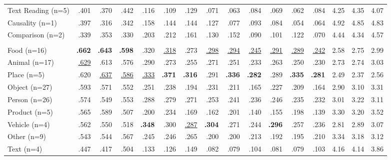 \begin{table}[ht]
{\begin{tabular}{lrrrrrrrrrrrrrrr}
Text Reading (n=5)  & .401 & .370 & .442 & .116 & .109 & .129 & .071 & .063 & .084 & .069 & .062 & .084 & 4.25 & 4.35 & 4.07 \\
Causality (n=1)  & .397 & .316 & .342 & .158 & .144 & .144 & .127 & .077 & .093 & .084 & .054 & .064 & 4.92 & 4.85 & 4.83 \\
Comparison (n=2)  & .339 & .353 & .330 & .203 & .212 & .161 & .130 & .152 & .090 & .101 & .122 & .070 & 4.44 & 4.34 & 4.57 \\
\addlinespace[4pt]
\midrule
\multicolumn{16}{l}{\textit{By entity type}} \\
\midrule
Food (n=16)  & \textbf{.662} & \textbf{.643} & \textbf{.598} & .320 & \underline{.318} & .273 & \underline{.298} & \underline{.294} & \underline{.245} & \underline{.291} & \underline{.289} & \underline{.242} & 2.58 & 2.75 & 2.99 \\
Animal (n=17)  & \underline{.629} & .613 & .576 & .290 & .273 & .255 & .271 & .251 & .233 & .263 & .250 & .230 & 2.73 & 2.74 & 3.03 \\
Place (n=5)  & .620 & \underline{.637} & \underline{.586} & \underline{.333} & \textbf{.371} & \textbf{.316} & .291 & \textbf{.336} & \textbf{.282} & .289 & \textbf{.335} & \textbf{.281} & 2.49 & 2.37 & 2.56 \\
Object (n=27)  & .593 & .571 & .552 & .251 & .238 & .194 & .231 & .211 & .165 & .227 & .209 & .164 & 2.90 & 3.10 & 3.31 \\
Person (n=26)  & .574 & .549 & .553 & .288 & .279 & .271 & .253 & .241 & .236 & .246 & .235 & .232 & 3.01 & 3.22 & 3.11 \\
Product (n=5)  & .565 & .589 & .507 & .200 & .234 & .169 & .162 & .201 & .140 & .155 & .198 & .139 & 3.30 & 3.20 & 3.52 \\
Vehicle (n=4)  & .562 & .550 & .518 & \textbf{.348} & .300 & \underline{.287} & \textbf{.304} & .271 & .244 & \textbf{.296} & .257 & .236 & 2.81 & 2.89 & 3.07 \\
Other (n=9)  & .543 & .544 & .567 & .245 & .246 & .265 & .200 & .200 & .213 & .192 & .195 & .210 & 3.34 & 3.18 & 3.12 \\
Text (n=4)  & .447 & .417 & .504 & .133 & .126 & .149 & .082 & .079 & .104 & .081 & .079 & .103 & 4.16 & 4.14 & 3.86 \\
\bottomrule
\end{tabular}
}%
\end{table}
